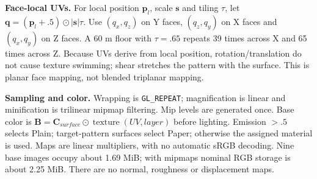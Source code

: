 \textbf{Face-local UVs.} For local position $\mathbf p_l$, scale $\mathbf s$ and tiling $\tau$, let $\mathbf q=(\mathbf p_l+.5)\odot|\mathbf s|\tau$. Use $(q_x,q_z)$ on Y faces, $(q_z,q_y)$ on X faces and $(q_x,q_y)$ on Z faces. A 60 m floor with $\tau=.65$ repeats 39 times across X and 65 times across Z. Because UVs derive from local position, rotation/translation do not cause texture swimming; shear stretches the pattern with the surface. This is planar face mapping, not blended triplanar mapping.

\textbf{Sampling and color.} Wrapping is \texttt{GL\_REPEAT}; magnification is linear and minification is trilinear mipmap filtering. Mip levels are generated once. Base color is $\mathbf B=\mathbf C_{surface}\odot\operatorname{texture}(UV,layer)$ before lighting. Emission $>.5$ selects Plain; target-pattern surfaces select Paper; otherwise the assigned material is used. Maps are linear multipliers, with no automatic sRGB decoding. Nine base images occupy about 1.69 MiB; with mipmaps nominal RGB storage is about 2.25 MiB. There are no normal, roughness or displacement maps.

